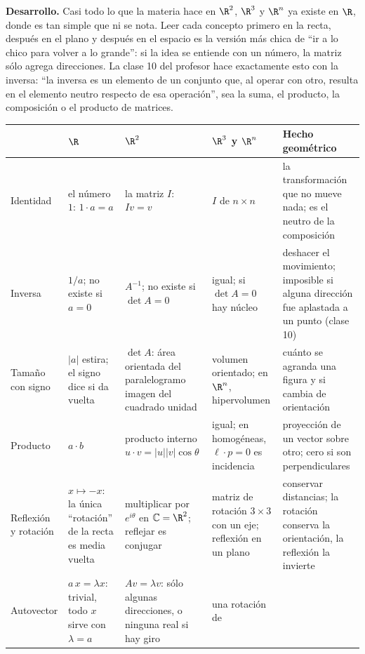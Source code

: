 \textbf{Desarrollo.} Casi todo lo que la materia hace en \(\R^2\), \(\R^3\) y \(\R^n\) ya
existe en \(\R\), donde es tan simple que ni se nota. Leer cada concepto primero en la
recta, después en el plano y después en el espacio es la versión más chica de ``ir a lo
chico para volver a lo grande'': si la idea se entiende con un número, la matriz sólo
agrega direcciones. La clase 10 del profesor hace exactamente esto con la inversa: ``la
inversa es un elemento de un conjunto que, al operar con otro, resulta en el elemento
neutro respecto de esa operación'', sea la suma, el producto, la composición o el producto
de matrices.

{\small
\begin{tabularx}{\textwidth}{>{\bfseries\raggedright\arraybackslash}p{17mm}>{\raggedright\arraybackslash}p{26mm}>{\raggedright\arraybackslash}p{32mm}>{\raggedright\arraybackslash}p{32mm}Y}
\toprule
& \(\R\) & \(\R^2\) & \(\R^3\) y \(\R^n\) & Hecho geométrico\\
\midrule
Identidad & el número \(1\): \(1\cdot a=a\) & la matriz \(I\): \(Iv=v\) & \(I\) de
\(n\times n\) & la transformación que no mueve nada; es el neutro de la composición\\
\addlinespace
Inversa & \(1/a\); no existe si \(a=0\) & \(A^{-1}\); no existe si \(\det A=0\) & igual;
si \(\det A=0\) hay núcleo & deshacer el movimiento; imposible si alguna dirección fue
aplastada a un punto (clase 10)\\
\addlinespace
Tamaño con signo & \(|a|\) estira; el signo dice si da vuelta & \(\det A\): área orientada
del paralelogramo imagen del cuadrado unidad & volumen orientado; en \(\R^n\),
hipervolumen & cuánto se agranda una figura y si cambia de orientación\\
\addlinespace
Producto & \(a\cdot b\) & producto interno \(u\cdot v=|u||v|\cos\theta\) & igual; en
homogéneas, \(\ell\cdot p=0\) es incidencia & proyección de un vector sobre otro; cero si
son perpendiculares\\
\addlinespace
Reflexión y rotación & \(x\mapsto -x\): la única ``rotación'' de la recta es media vuelta
& multiplicar por \(e^{i\theta}\) en \(\mathbb{C}=\R^2\); reflejar es conjugar &
matriz de rotación \(3\times3\) con un eje; reflexión en un plano & conservar distancias;
la rotación conserva la orientación, la reflexión la invierte\\
\addlinespace
Autovector & \(a\,x=\lambda x\): trivial, todo \(x\) sirve con \(\lambda=a\) &
\(Av=\lambda v\): sólo algunas direcciones, o ninguna real si hay giro & una rotación de

\end{tabularx}}
